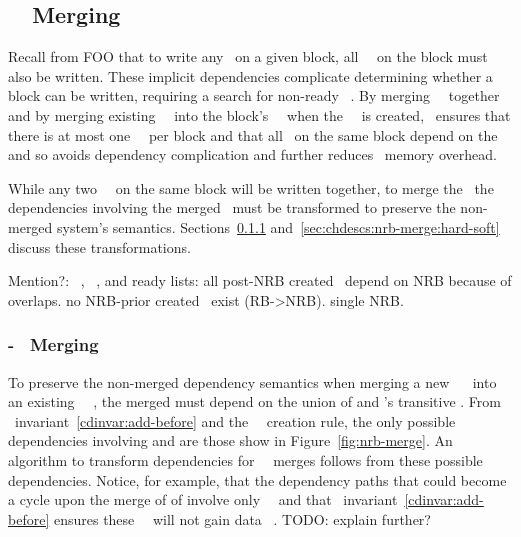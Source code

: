 \subsection{\Nrb\ \ChDesc\ Merging}
\label{sec:chdescs:nrb-merge}
Recall from FOO that to write any \chdesc\ on a given block,
all \nrb\ \chdescs\ on the block must also be written. 
%
These implicit dependencies complicate determining whether a block can
be written, requiring a search for non-ready \nrb\ \chdescs.
%
By merging \nrb\ \chdescs\ together and by merging existing \rb\
\chdescs\ into the block's \nrb\ \chdesc\ when the \nrb\ \chdesc\ is
created,
%
\Kudos\ ensures that there is at most one \nrb\ \chdesc\ per block and
that all \chdescs\ on the same block depend on the \nrb\
\chdesc\,
%
and so avoids dependency complication and further reduces \chdesc\
memory overhead.

While any two \nrb\ \chdescs\ on the same block will be written
together, to merge the \chdescs\ the dependencies involving the merged
\chdescs\ must be transformed to preserve the non-merged system's
semantics.  Sections~\ref{sec:chdescs:nrb-merge:hard-hard}
and~\ref{sec:chdescs:nrb-merge:hard-soft} discuss these
transformations.

Mention?:
%
\Nrb\ \chdescs, \rb\ \chdescs, and ready lists:
%
all post-NRB created \chdescs\ depend on NRB because of overlaps.
%
no NRB-prior created \chdescs\ exist (RB->NRB).
%
single NRB.

\subsubsection{\Nrb{}-\Nrb{} \ChDesc\ Merging}
\label{sec:chdescs:nrb-merge:hard-hard}
To preserve the non-merged dependency semantics when merging a new
\nrb\ \chdesc\  into an existing \nrb\ \chdesc\ \p{p}, the merged
\p{(p+q)} must depend on the union of \p{p} and 's transitive
\befores.
%
From \chdesc\ invariant~\ref{cdinvar:add-before} and the \nrb\
\chdesc\ creation rule, the only possible dependencies involving 
and \p{q} are those show in Figure~\ref{fig:nrb-merge}.
%
An algorithm to transform dependencies for \nrb\ \chdesc\ merges
follows from these possible dependencies.
%
Notice, for example, that the dependency paths that could become a
cycle upon the merge of \p{p} of \p{q} involve only \noop\ \chdescs\
and that \chdesc\ invariant~\ref{cdinvar:add-before} ensures these
\noop\ \chdesc\ will not gain data \chdesc\ \befores.
%
TODO: explain further?

